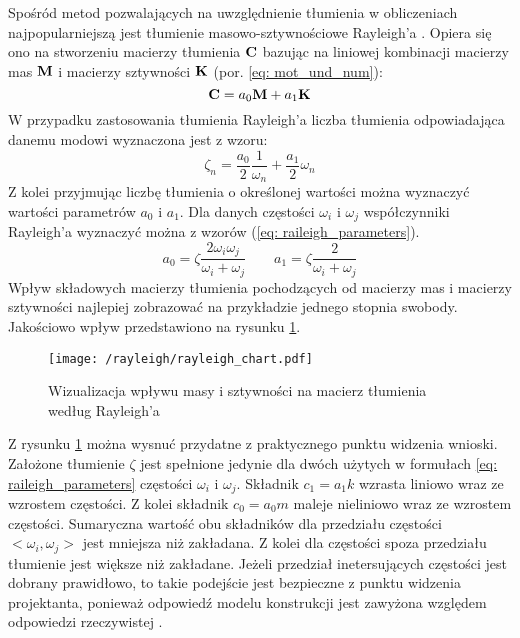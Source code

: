 Spośród metod pozwalających na uwzględnienie tłumienia w obliczeniach najpopularniejszą jest tłumienie masowo-sztywnościowe Rayleigh'a \parencite{Chopra2012a}. Opiera się ono na stworzeniu macierzy tłumienia $\mathbf{C}$ bazując na liniowej kombinacji macierzy mas $\mathbf{M}$ i macierzy sztywności $\mathbf{K}$ (por. \ref{eq: mot_und_num}):
\begin{equation} \label{eq: rayleigh_damping}
	\mathbf{C}=a_0\mathbf{M}+a_1\mathbf{K}
\end{equation}
W przypadku zastosowania tłumienia Rayleigh'a liczba tłumienia odpowiadająca danemu modowi wyznaczona jest z wzoru:
\begin{equation} \label{eq: damping_rayleigh}
	\zeta_n = \frac{a_0}{2}\frac{1}{\omega_n} + \frac{a_1}{2}\omega_n
\end{equation}
Z kolei przyjmując liczbę tłumienia o określonej wartości można wyznaczyć wartości parametrów $a_0$ i $a_1$. Dla danych częstości $\omega_i$ i $\omega_j$ współczynniki Rayleigh'a wyznaczyć można z wzorów (\ref{eq: raileigh_parameters}).
\begin{equation} \label{eq: raileigh_parameters}
	a_0 = \zeta\frac{2\omega_i\omega_j}{\omega_i+\omega_j} \qquad a_1 = \zeta\frac{2}{\omega_i+\omega_j}
\end{equation}
Wpływ składowych macierzy tłumienia pochodzących od macierzy mas i macierzy sztywności najlepiej zobrazować na przykładzie jednego stopnia swobody. Jakościowo wpływ przedstawiono na rysunku \ref{fig: rayleigh_chart}.
\begin{figure}[h] 
	\centering
	\texttt{[image: /rayleigh/rayleigh\_chart.pdf]}
	\captionsetup{justification=centering}
	\caption{Wizualizacja wpływu masy i sztywności na macierz tłumienia według Rayleigh'a}
	\label{fig: rayleigh_chart}
\end{figure}
Z rysunku \ref{fig: rayleigh_chart} można wysnuć przydatne z praktycznego punktu widzenia wnioski. Założone tłumienie $\zeta$ jest spełnione jedynie dla dwóch użytych w formułach \ref{eq: raileigh_parameters} częstości $\omega_i$ i $\omega_j$. Składnik $c_1=a_1 k$ wzrasta liniowo wraz ze wzrostem częstości. Z kolei składnik $c_0 = a_0 m$ maleje nieliniowo wraz ze wzrostem częstości. Sumaryczna wartość obu składników dla przedziału częstości $<\omega_i ,\omega_j>$ jest mniejsza niż zakładana. Z kolei dla częstości spoza przedziału tłumienie jest większe niż zakładane. Jeżeli przedział inetersujących częstości jest dobrany prawidłowo, to takie podejście jest bezpieczne z punktu widzenia projektanta, ponieważ odpowiedź modelu konstrukcji jest zawyżona względem odpowiedzi rzeczywistej \parencite{Oleszek2015}.


